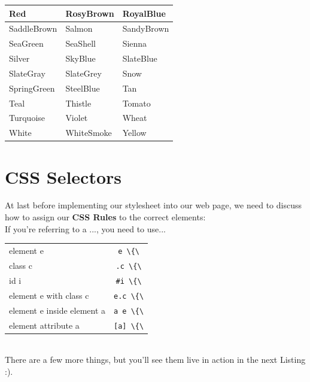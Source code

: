 \documentclass[a4paper,12pt]{article}
\newcommand{\htmlelem}[1]{\lstinline[columns=fixed,language=HTML]{#1}}
\newcommand{\nsp}{\vspace{0.05cm}\\}
\begin{document}
\begin{center}
\begin{longtable}{|p{}|p{}|p{}|}
    \cellcolor[HTML]{FF0000} Red               & \cellcolor[HTML]{BC8F8F} RosyBrown            & \cellcolor[HTML]{4169E1} RoyalBlue       \\ \hline
    \cellcolor[HTML]{8B4513} SaddleBrown       & \cellcolor[HTML]{FA8072} Salmon               & \cellcolor[HTML]{F4A460} SandyBrown      \\ \hline
    \cellcolor[HTML]{2E8B57} SeaGreen          & \cellcolor[HTML]{FFF5EE} SeaShell             & \cellcolor[HTML]{A0522D} Sienna          \\ \hline
    \cellcolor[HTML]{C0C0C0} Silver            & \cellcolor[HTML]{87CEEB} SkyBlue              & \cellcolor[HTML]{6A5ACD} SlateBlue       \\ \hline
    \cellcolor[HTML]{708090} SlateGray         & \cellcolor[HTML]{708090} SlateGrey            & \cellcolor[HTML]{FFFAFA} Snow            \\ \hline
    \cellcolor[HTML]{00FF7F} SpringGreen       & \cellcolor[HTML]{4682B4} SteelBlue            & \cellcolor[HTML]{D2B48C} Tan             \\ \hline
    \cellcolor[HTML]{008080} Teal              & \cellcolor[HTML]{D8BFD8} Thistle              & \cellcolor[HTML]{FF6347} Tomato          \\ \hline
    \cellcolor[HTML]{40E0D0} Turquoise         & \cellcolor[HTML]{EE82EE} Violet               & \cellcolor[HTML]{F5DEB3} Wheat           \\ \hline
    \cellcolor[HTML]{FFFFFF} White             & \cellcolor[HTML]{F5F5F5} WhiteSmoke           & \cellcolor[HTML]{FFFF00} Yellow          \\ \hline
\end{longtable}
\end{center}
\newpage

\section{CSS Selectors}
At last before implementing our stylesheet into our web page, we need to discuss how to assign our \textbf{CSS Rules} to the correct elements:\nsp
If you're referring to a ..., you need to use... \nsp
\setlength{\arrayrulewidth}{0.4pt}
\setlength{\tabcolsep}{6pt}
\begin{tabular}{|l|c|}
    \hline
    element e & \htmlelem{e \{\}} \\
    class c & \htmlelem{.c \{\}} \\
    id i & \htmlelem{#i \{\}} \\
    element e with class c & \htmlelem{e.c \{\}} \\
    element e inside element a & \htmlelem{a e \{\}} \\
    element attribute a & \htmlelem{[a] \{\}}\\
    \hline
\end{tabular}\nsp
There are a few more things, but you'll see them live in action in the next Listing :).
\end{document}
